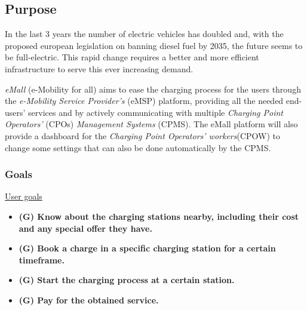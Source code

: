 \documentclass[table, 12pt]{article} %
\begin{document}
    \subsection{Purpose} %

         
        In the last 3 years the number of electric vehicles has doubled and, with the proposed european legislation on banning diesel fuel by 2035, the future seems to be full-electric. This rapid change requires a better and more efficient infrastructure to serve this ever increasing demand.

        

        \emph{eMall} (e-Mobility for all) aims to ease the charging process for the users through the \emph{e-Mobility Service Provider's} (eMSP) platform,
        providing all the needed end-users' services and by actively communicating with multiple \emph{Charging Point Operators'} (CPOs) \emph{Management Systems} (CPMS).
        The eMall platform will also provide a dashboard for the \emph{Charging Point Operators' workers}(CPOW) to change some settings that can also be done automatically by the CPMS.

    \subsubsection{Goals}
        \underline{User goals}
        \begin{itemize}
            \item  \textbf{(G) Know about the charging stations nearby, including their cost and any special offer they have.}
            \item  \textbf{(G) Book a charge in a specific charging station for a certain timeframe.}
            \item  \textbf{(G) Start the charging process at a certain station.}
            \item  \textbf{(G) Pay for the obtained service.}
        \end{itemize}
        
\end{document}
